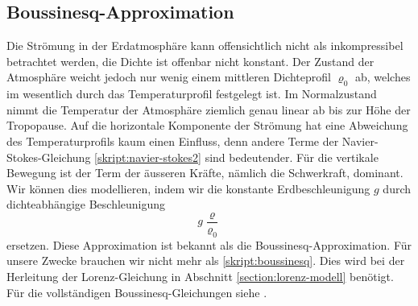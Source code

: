 \subsection{Boussinesq-Approximation}
Die Strömung in der Erdatmosphäre kann offensichtlich nicht als
inkompressibel betrachtet werden, die Dichte ist offenbar nicht
konstant.
Der Zustand der Atmosphäre weicht jedoch nur wenig einem mittleren
Dichteprofil $\varrho_0$ ab, welches im wesentlich durch das Temperaturprofil
festgelegt ist.
Im Normalzustand nimmt die Temperatur der Atmosphäre ziemlich genau
linear ab bis zur Höhe der Tropopause.
Auf die horizontale Komponente der Strömung hat eine Abweichung des
Temperaturprofils kaum einen Einfluss, denn andere Terme der
Navier-Stokes-Gleichung
\eqref{skript:navier-stokes2}
sind bedeutender.
Für die vertikale Bewegung ist der Term der äusseren Kräfte,
nämlich die Schwerkraft, dominant.
Wir können dies modellieren, indem wir die konstante Erdbeschleunigung
$g$ durch dichteabhängige Beschleunigung
\begin{equation}
g\frac{\varrho}{\varrho_0}
\label{skript:boussinesq}
\end{equation}
ersetzen.
Diese Approximation ist bekannt als die Boussinesq-Approximation.
Für unsere Zwecke brauchen wir nicht mehr als \eqref{skript:boussinesq}.
Dies wird bei der Herleitung der Lorenz-Gleichung in Abschnitt
\ref{section:lorenz-modell} benötigt.
Für die vollständigen Boussinesq-Gleichungen siehe \cite{skript:kaperengler}.

